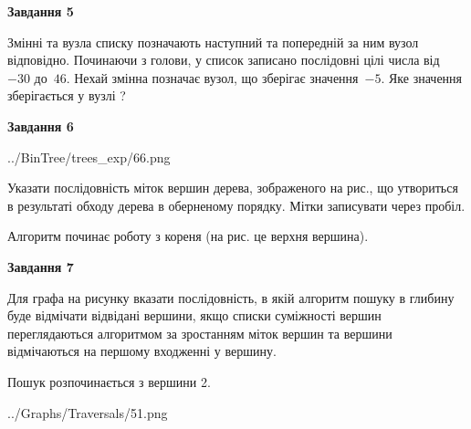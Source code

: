 \documentclass[12pt, ukrainian]{article}
\begin{document}
{\begin {large}
{\begin {center}\textbf{Завдання 5}\end {center}}\par
Змінні  та  вузла списку позначають наступний та попередній за ним вузол відповідно. Починаючи з голови, у список записано послідовні цілі числа від~$-30$ до~$46$. Нехай змінна  позначає вузол, що зберігає значення~$-5$.
Яке значення зберігається у вузлі  ?\par
\newpage

{\begin {center}\textbf{Завдання 6}\end {center}}\par

\begin{center}
	{../BinTree/trees_exp/66.png}
\end{center}
Указати послідовність міток вершин дерева, зображеного на рис., що утвориться в результаті обходу дерева в оберненому порядку. Мітки записувати через пробіл.\par Алгоритм починає роботу з кореня (на рис. це верхня вершина).\par
\newpage

{\begin {center}\textbf{Завдання 7}\end {center}}\par
Для графа на рисунку вказати послідовність, в якій алгоритм пошуку в глибину буде відмічати відвідані вершини, якщо списки суміжності вершин переглядаються алгоритмом за зростанням міток вершин та вершини відмічаються на першому вход\-женні у вершину.\par
Пошук розпочинається з вершини 2.\par

\begin{center}
	{../Graphs/Traversals/51.png}
\end{center}\par
\newpage


\end{large}}
\end{document}
